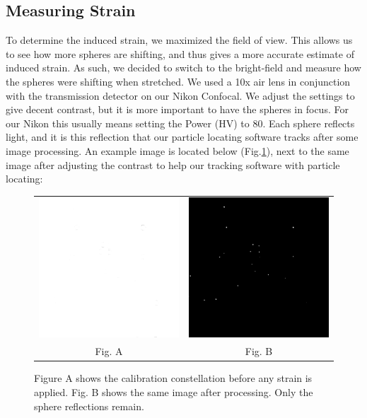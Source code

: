 \subsection{Measuring Strain}
To determine the induced strain, we maximized the field of view. This allows us to see how more spheres are shifting, and thus gives a more accurate estimate of induced strain. As such, we decided to switch to the bright-field and measure how the spheres were shifting when stretched. We used a 10x air lens in conjunction with the transmission detector on our Nikon Confocal. We adjust the settings to give decent contrast, but it is more important to have the spheres in focus. For our Nikon this usually means setting the Power (HV) to 80. Each sphere reflects light, and it is this reflection that our particle locating software tracks after some image processing. An example image is located below (Fig.\ref{fig:TDpreandpost}), next to the same image after adjusting the contrast to help our tracking software with particle locating: 

\begin{figure}[h!]
	\begin{tabular}{cc}
		\includegraphics[width= .48\linewidth]{Chapters/Figures/1xzoom_constellation_zeroStrain.png} & \includegraphics[width= .48\linewidth]{Chapters/Figures/1xzoom_constellation_zeroStrain_supercontrast.png}\\
		Fig. A & Fig. B
	\end{tabular}
	\caption[Bright-field pre and post image processing]{Figure A shows the calibration constellation before any strain is applied. Fig. B shows the same image after processing. Only the sphere reflections remain.}
		\label{fig:TDpreandpost}
\end{figure}

